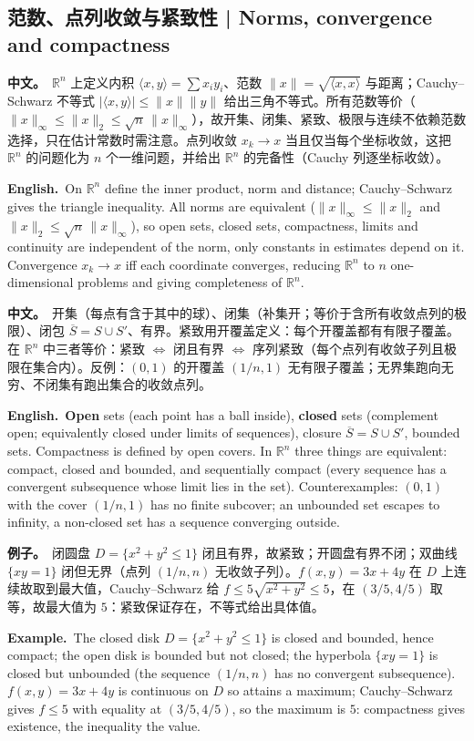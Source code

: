 \documentclass[UTF8,11pt,a4paper]{ctexart}
\newcommand{\R}{\mathbb{R}}
\newcommand{\BOTH}[2]{\par\noindent\textbf{中文。}\ #1\par\noindent\textbf{English.}\ #2\par}
\newcommand{\EX}[2]{\par\noindent\textbf{例子。}\ #1\par\noindent\textbf{Example.}\ #2\par}
\begin{document}
\subsection{范数、点列收敛与紧致性 | Norms, convergence and compactness}
\BOTH{$\R^n$ 上定义内积 $\langle x,y\rangle=\sum x_iy_i$、范数 $\|x\|=\sqrt{\langle x,x\rangle}$ 与距离；Cauchy--Schwarz 不等式 $|\langle x,y\rangle|\le\|x\|\|y\|$ 给出三角不等式。所有范数等价（$\|x\|_\infty\le\|x\|_2\le\sqrt n\,\|x\|_\infty$），故开集、闭集、紧致、极限与连续不依赖范数选择，只在估计常数时需注意。点列收敛 $x_k\to x$ 当且仅当每个坐标收敛，这把 $\R^n$ 的问题化为 $n$ 个一维问题，并给出 $\R^n$ 的完备性（Cauchy 列逐坐标收敛）。}{On $\R^n$ define the inner product, norm and distance; Cauchy--Schwarz gives the triangle inequality. All norms are equivalent ($\|x\|_\infty\le\|x\|_2$ and $\|x\|_2\le\sqrt n\,\|x\|_\infty$), so open sets, closed sets, compactness, limits and continuity are independent of the norm, only constants in estimates depend on it. Convergence $x_k\to x$ iff each coordinate converges, reducing $\R^n$ to $n$ one-dimensional problems and giving completeness of $\R^n$.}
\BOTH{开集（每点有含于其中的球）、闭集（补集开；等价于含所有收敛点列的极限）、闭包 $\overline S=S\cup S'$、有界。紧致用开覆盖定义：每个开覆盖都有有限子覆盖。在 $\R^n$ 中三者等价：紧致 $\Leftrightarrow$ 闭且有界 $\Leftrightarrow$ 序列紧致（每个点列有收敛子列且极限在集合内）。反例：$(0,1)$ 的开覆盖 $(1/n,1)$ 无有限子覆盖；无界集跑向无穷、不闭集有跑出集合的收敛点列。}{\textbf{Open} sets (each point has a ball inside), \textbf{closed} sets (complement open; equivalently closed under limits of sequences), closure $\overline S=S\cup S'$, bounded sets. Compactness is defined by open covers. In $\R^n$ three things are equivalent: compact, closed and bounded, and sequentially compact (every sequence has a convergent subsequence whose limit lies in the set). Counterexamples: $(0,1)$ with the cover $(1/n,1)$ has no finite subcover; an unbounded set escapes to infinity, a non-closed set has a sequence converging outside.}
\EX{闭圆盘 $D=\{x^2+y^2\le1\}$ 闭且有界，故紧致；开圆盘有界不闭；双曲线 $\{xy=1\}$ 闭但无界（点列 $(1/n,n)$ 无收敛子列）。$f(x,y)=3x+4y$ 在 $D$ 上连续故取到最大值，Cauchy--Schwarz 给 $f\le5\sqrt{x^2+y^2}\le5$，在 $(3/5,4/5)$ 取等，故最大值为 $5$：紧致保证存在，不等式给出具体值。}{The closed disk $D=\{x^2+y^2\le1\}$ is closed and bounded, hence compact; the open disk is bounded but not closed; the hyperbola $\{xy=1\}$ is closed but unbounded (the sequence $(1/n,n)$ has no convergent subsequence). $f(x,y)=3x+4y$ is continuous on $D$ so attains a maximum; Cauchy--Schwarz gives $f\le5$ with equality at $(3/5,4/5)$, so the maximum is $5$: compactness gives existence, the inequality the value.}
\end{document}
